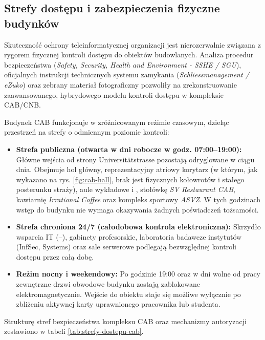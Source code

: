 \subsection{Strefy dostępu i zabezpieczenia fizyczne budynków}\label{subsec:bezpieczenstwo-fizyczne}

Skuteczność ochrony teleinformatycznej organizacji jest nierozerwalnie związana z rygorem fizycznej kontroli dostępu do obiektów budowlanych. Analiza procedur bezpieczeństwa (\textit{Safety, Security, Health and Environment - SSHE / SGU}), oficjalnych instrukcji technicznych systemu zamykania (\textit{Schliessmanagement / eZuko}) oraz zebrany materiał fotograficzny pozwoliły na zrekonstruowanie zaawansowanego, hybrydowego modelu kontroli dostępu w kompleksie CAB/CNB.


Budynek CAB funkcjonuje w zróżnicowanym reżimie czasowym, dzieląc przestrzeń na strefy o odmiennym poziomie kontroli:
\begin{itemize}
    \item \textbf{Strefa publiczna (otwarta w dni robocze w godz. 07:00--19:00):} Główne wejścia od strony Universitätstrasse pozostają odryglowane w ciągu dnia. Obejmuje hol główny, reprezentacyjny atriowy korytarz (w którym, jak wykazano na rys. \ref{fig:cab-hall}, brak jest fizycznych kołowrotów i stałego posterunku straży), aule wykładowe  i , stołówkę \textit{SV Restaurant CAB}, kawiarnię \textit{Irrational Coffee} oraz kompleks sportowy \textit{ASVZ}. W tych godzinach wstęp do budynku nie wymaga okazywania żadnych poświadczeń tożsamości.
    \item \textbf{Strefa chroniona 24/7 (całodobowa kontrola elektroniczna):} Skrzydło wsparcia IT (--), gabinety profesorskie, laboratoria badawcze instytutów (InfSec, Systems) oraz sale serwerowe podlegają bezwzględnej kontroli dostępu przez całą dobę.
    \item \textbf{Reżim nocny i weekendowy:} Po godzinie 19:00 oraz w dni wolne od pracy zewnętrzne drzwi obwodowe budynku zostają zablokowane elektromagnetycznie. Wejście do obiektu staje się możliwe wyłącznie po zbliżeniu aktywnej karty uprawnionego pracownika lub studenta.
\end{itemize}

Strukturę stref bezpieczeństwa kompleksu CAB oraz mechanizmy autoryzacji zestawiono w tabeli \ref{tab:strefy-dostepu-cab}.

